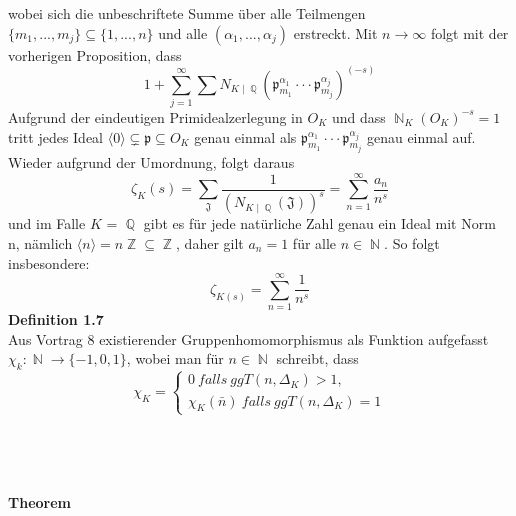 \documentclass[10pt,a4paper]{article}
\DeclareMathOperator{\Q}{\mathbb{Q}}
\DeclareMathOperator{\Z}{\mathbb{Z}}
\DeclareMathOperator{\N}{\mathbb{N}}
\begin{document}
wobei sich die unbeschriftete Summe über alle Teilmengen $\{m_{1},...,m_{j}\}\subseteq \{ 1,...,n\}$ und alle $(\alpha_1,...,\alpha_j)$ erstreckt. Mit $n \rightarrow \infty$ folgt mit der vorherigen Proposition, dass $$1+\sum_{j=1}^{\infty}\sum N_{K\mid \Q}(\mathfrak{p}_{m_1}^{\alpha_1}\cdot\cdot\cdot\mathfrak{p}_{m_j}^{\alpha_j})^{(-s)}$$
Aufgrund der eindeutigen Primidealzerlegung in $O_K$ und dass $\N_K(O_K)^{-s}=1$ tritt jedes Ideal $\langle0\rangle\subsetneq \mathfrak{p} \subseteq O_{\textit{K}}$ genau einmal als $\mathfrak{p}_{m_1}^{\alpha_1}\cdot\cdot\cdot\mathfrak{p}_{m_j}^{\alpha_j}$ genau einmal auf. Wieder aufgrund der Umordnung, folgt daraus $$\zeta_{K}(s) = \sum_{\mathfrak{J}}\frac{1}{(N_{K\mid\Q}(\mathfrak{J}))^s}=\sum_{n=1}^{\infty}\frac{a_n}{n^s}$$ und im Falle $\textit{K}$ = $\Q$ gibt es für jede natürliche Zahl genau ein Ideal mit Norm n, nämlich $\langle n\rangle=n\Z\subseteq \Z$, daher gilt $a_n=1$ für alle $n\in \N$. So folgt insbesondere: $$\zeta_{K(s)}= \sum_{n=1}^{\infty}\frac{1}{n^s}$$
\textbf{Definition 1.7 }
\\

Aus Vortrag 8 existierender Gruppenhomomorphismus als Funktion aufgefasst $\chi_k \colon \N \rightarrow \{-1,0,1 \}$, wobei man für $n \in \N$ schreibt, dass $$\chi_K=\begin{cases}0 \ falls \ ggT(n,\Delta_K) >1,\\\chi_{K}(\bar{n})\ falls\ ggT(n,\Delta_K) =1\end{cases}$$
\\
\\
\\
\\
\textbf{Theorem}
\\
\end{document}

